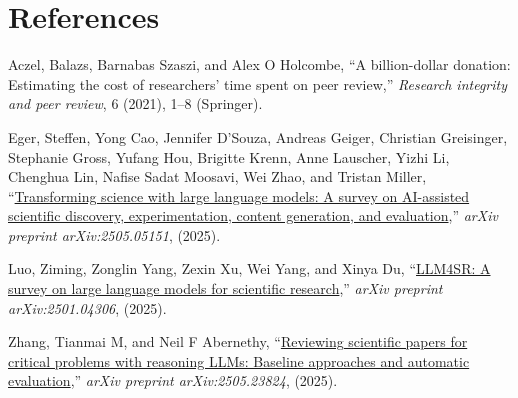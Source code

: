 \documentclass[
  11pt,
  letterpaper,
  DIV=11,
  numbers=noendperiod]{scrreprt}
\newlength{\cslhangindent}
\newlength{\cslentryspacingunit} %
\newenvironment{CSLReferences}[2] %
 {%
  \setlength{\parindent}{0pt}
  \ifodd #1
  \let\oldpar\par
  \def\par{\hangindent=\cslhangindent\oldpar}
  \fi
  \setlength{\parskip}{#2\cslentryspacingunit}
 }%
 {}
\begin{document}

\hypertarget{references}{%
\chapter*{References}\label{references}}

\hypertarget{refs}{}
\begin{CSLReferences}{1}{0}
\leavevmode{}%
Aczel, Balazs, Barnabas Szaszi, and Alex O Holcombe, {``A billion-dollar
donation: Estimating the cost of researchers' time spent on peer
review,''} \emph{Research integrity and peer review}, 6 (2021), 1--8
(Springer).

\leavevmode{}%
Eger, Steffen, Yong Cao, Jennifer D'Souza, Andreas Geiger, Christian
Greisinger, Stephanie Gross, Yufang Hou, Brigitte Krenn, Anne Lauscher,
Yizhi Li, Chenghua Lin, Nafise Sadat Moosavi, Wei Zhao, and Tristan
Miller, {``\href{https://arxiv.org/abs/2502.05151}{Transforming science
with large language models: A survey on AI-assisted scientific
discovery, experimentation, content generation, and evaluation},''}
\emph{arXiv preprint arXiv:2505.05151}, (2025).

\leavevmode{}%
Luo, Ziming, Zonglin Yang, Zexin Xu, Wei Yang, and Xinya Du,
{``\href{https://arxiv.org/abs/2501.04306}{LLM4SR: A survey on large
language models for scientific research},''} \emph{arXiv preprint
arXiv:2501.04306}, (2025).

\leavevmode{}%
Zhang, Tianmai M, and Neil F Abernethy,
{``\href{https://arxiv.org/abs/2505.23824v2}{Reviewing scientific papers
for critical problems with reasoning LLMs: Baseline approaches and
automatic evaluation},''} \emph{arXiv preprint arXiv:2505.23824},
(2025).

\end{CSLReferences}
\end{document}
